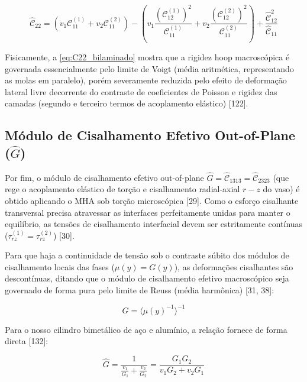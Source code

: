 \begin{equation}
  \hat{\mathcal{C}}_{22} = (v_1 \mathcal{C}_{11}^{(1)} + v_2 \mathcal{C}_{11}^{(2)}) - \left( v_1 \frac{(\mathcal{C}_{12}^{(1)})^2}{\mathcal{C}_{11}^{(1)}} + v_2 \frac{(\mathcal{C}_{12}^{(2)})^2}{\mathcal{C}_{11}^{(2)}} \right) + \frac{\hat{\mathcal{C}}_{12}^2}{\hat{\mathcal{C}}_{11}}
  \label{eq:C22_bilaminado}
\end{equation}

Fisicamente, a \eqref{eq:C22_bilaminado} mostra que a rigidez hoop macroscópica é governada essencialmente pelo limite de Voigt (média aritmética, representando as molas em paralelo), porém severamente reduzida pelo efeito de deformação lateral livre decorrente do contraste de coeficientes de Poisson e rigidez das camadas (segundo e terceiro termos de acoplamento elástico) [122].

\subsection{Módulo de Cisalhamento Efetivo Out-of-Plane ($\hat{G}$)}

Por fim, o módulo de cisalhamento efetivo out-of-plane $\hat{G} = \hat{\mathcal{C}}_{1313} = \hat{\mathcal{C}}_{2323}$ (que rege o acoplamento elástico de torção e cisalhamento radial-axial $r-z$ do vaso) é obtido aplicando o MHA sob torção microscópica [29]. Como o esforço cisalhante transversal precisa atravessar as interfaces perfeitamente unidas para manter o equilíbrio, as tensões de cisalhamento interfacial devem ser estritamente contínuas ($\tau_{rz}^{(1)} = \tau_{rz}^{(2)}$) [30].

Para que haja a continuidade de tensão sob o contraste súbito dos módulos de cisalhamento locais das fases ($\mu(y) = G(y)$), as deformações cisalhantes são descontínuas, ditando que o módulo de cisalhamento efetivo macroscópico seja governado de forma pura pelo limite de Reuss (média harmônica) [31, 38]:

\begin{equation}
  \hat{G} = \langle \mu(y)^{-1} \rangle^{-1}
  \label{eq:Chatg_Calculation}
\end{equation}

Para o nosso cilindro bimetálico de aço e alumínio, a relação fornece de forma direta [132]:

\begin{equation}
  \hat{G} = \frac{1}{\frac{v_1}{G_1} + \frac{v_2}{G_2}} = \frac{G_1 G_2}{v_1 G_2 + v_2 G_1}
  \label{eq:G_bilaminado}
\end{equation}

